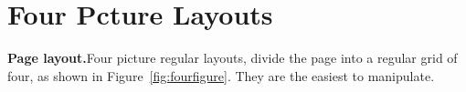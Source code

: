 \section{Four Pcture Layouts}
\setlength{\columnsep}{0pt}

\begin{multicols}{2}
\normalsize
\textbf{Page layout.}\quad Four picture regular layouts, divide the page into a regular grid of four, as shown in Figure~\ref{fig:fourfigure}. They are the easiest to manipulate.
\smallskip
{}
\par
\hspace{-20pt}\begin{minipage}{0.45\textwidth}\par
{}
\label{fig:fourfigure}
\end{minipage}

\medskip

\lipsum
{}
\medskip
\hskip-10pt\begin{minipage}{0.5\textwidth}\par
{}
\label{fig:fourfigure}
\end{minipage}
\smallskip
\end{multicols}
\clearpage
